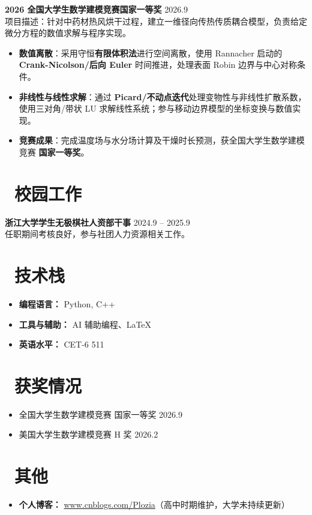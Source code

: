 \documentclass[11pt]{article}
\newlength{\interProjectSpacing}
\newcommand{\projectsep}{\vspace{\interProjectSpacing}}
\newlength{\intraProjectTitleSep}
\newcommand{\titlebreak}{\\[\intraProjectTitleSep]}
\newlength{\intraProjectListTopSep}
\begin{document}
\projectsep

\textbf{2026 全国大学生数学建模竞赛\quad 国家一等奖} \hfill 2026.9 \titlebreak
项目描述：针对中药材热风烘干过程，建立一维径向传热传质耦合模型，负责给定微分方程的数值求解与程序实现。
\begin{itemize}[nosep, topsep=\intraProjectListTopSep]
    \item \textbf{数值离散}：采用守恒\textbf{有限体积法}进行空间离散，使用 Rannacher 启动的 \textbf{Crank-Nicolson/后向 Euler} 时间推进，处理表面 Robin 边界与中心对称条件。
    \item \textbf{非线性与线性求解}：通过 \textbf{Picard/不动点迭代}处理变物性与非线性扩散系数，使用三对角/带状 LU 求解线性系统；参与移动边界模型的坐标变换与数值实现。
    \item \textbf{竞赛成果}：完成温度场与水分场计算及干燥时长预测，获全国大学生数学建模竞赛 \textbf{国家一等奖}。
\end{itemize}

\section{\makebox[\widthof{\faUsers}][c]{\color{CVBlue}\faUsers}\ 校园工作}
\textbf{浙江大学学生无极棋社\quad 人资部干事} \hfill 2024.9 -- 2025.9 \titlebreak
任职期间考核良好，参与社团人力资源相关工作。

\section{\makebox[\widthof{\faCogs}][c]{\color{CVBlue}\faCogs}\ 技术栈}
\begin{itemize}[nosep]
    \item \textbf{编程语言：} Python, C++
    \item \textbf{工具与辅助：} AI 辅助编程、LaTeX
    \item \textbf{英语水平：} CET-6 511
\end{itemize}

\section{\makebox[\widthof{\faGraduationCap}][c]{\color{CVBlue}\faList}\ 获奖情况}
\begin{itemize}
    \item 全国大学生数学建模竞赛 \quad 国家一等奖 \hfill 2026.9
    \item 美国大学生数学建模竞赛 \quad H 奖 \hfill 2026.2
\end{itemize}

\section{\makebox[\widthof{\faInfo}][c]{\color{CVBlue}\faInfo}\ 其他}
\begin{itemize}[parsep=0.5ex]
    \item \textbf{个人博客：} \href{https://www.cnblogs.com/Plozia}{www.cnblogs.com/Plozia}（高中时期维护，大学未持续更新）
\end{itemize}
\end{document}
